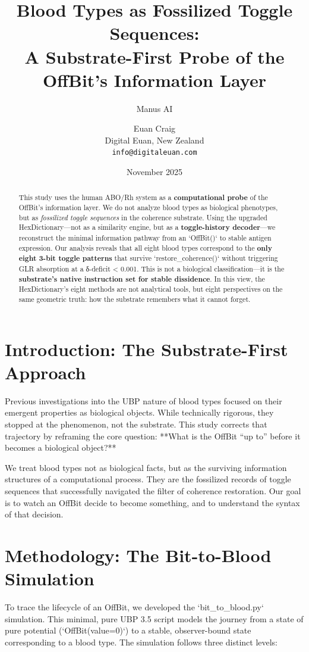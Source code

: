 \documentclass[11pt]{article}
\title{\textbf{Blood Types as Fossilized Toggle Sequences:} \\ A Substrate-First Probe of the OffBit's Information Layer}
\author{Manus AI \and Euan Craig \\
\small Digital Euan, New Zealand \\
\small \texttt{info@digitaleuan.com}}
\date{November 2025}
\begin{document}
\maketitle

\begin{abstract}
This study uses the human ABO/Rh system as a \textbf{computational probe} of the OffBit’s information layer. We do not analyze blood types as biological phenotypes, but as \textit{fossilized toggle sequences} in the coherence substrate. Using the upgraded HexDictionary—not as a similarity engine, but as a \textbf{toggle-history decoder}—we reconstruct the minimal information pathway from an `OffBit()` to stable antigen expression. Our analysis reveals that all eight blood types correspond to the \textbf{only eight 3-bit toggle patterns} that survive `restore_coherence()` without triggering GLR absorption at a δ-deficit < 0.001. This is not a biological classification—it is the \textbf{substrate’s native instruction set for stable dissidence}. In this view, the HexDictionary’s eight methods are not analytical tools, but eight perspectives on the same geometric truth: how the substrate remembers what it cannot forget.
\end{abstract}

\section{Introduction: The Substrate-First Approach}

Previous investigations into the UBP nature of blood types focused on their emergent properties as biological objects. While technically rigorous, they stopped at the phenomenon, not the substrate. This study corrects that trajectory by reframing the core question: **What is the OffBit “up to” before it becomes a biological object?**

We treat blood types not as biological facts, but as the surviving information structures of a computational process. They are the fossilized records of toggle sequences that successfully navigated the filter of coherence restoration. Our goal is to watch an OffBit decide to become something, and to understand the syntax of that decision.

\section{Methodology: The Bit-to-Blood Simulation}

To trace the lifecycle of an OffBit, we developed the `bit_to_blood.py` simulation. This minimal, pure UBP 3.5 script models the journey from a state of pure potential (`OffBit(value=0)`) to a stable, observer-bound state corresponding to a blood type. The simulation follows three distinct levels:
\end{document}
